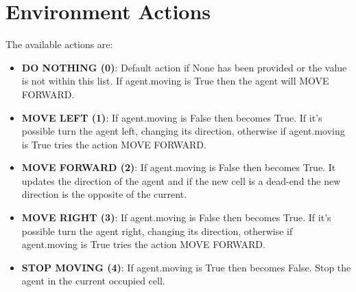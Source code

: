 \section{Environment Actions}
\label{sec:envActions}
The available actions are:
\begin{itemize}
\item \textbf{DO NOTHING (0)}: Default action if None has been provided or the value is not within this list. If agent.moving is True then the agent will MOVE FORWARD.
\item \textbf{MOVE LEFT (1)}: If agent.moving is False then becomes True. If it’s possible turn the agent left, changing its direction, otherwise if agent.moving is True tries the action MOVE FORWARD.
\item \textbf{MOVE FORWARD (2)}: If agent.moving is False then becomes True. It updates the direction of the agent and if the new cell is a dead-end the new direction is the opposite of the current.

\item \textbf{MOVE RIGHT (3)}: If agent.moving is False then becomes True. If it’s possible turn the agent right, changing its direction, otherwise if agent.moving is True tries the action MOVE FORWARD.
\item \textbf{STOP MOVING (4)}: If agent.moving is True then becomes False. Stop the agent in the current occupied cell.
\end{itemize}
